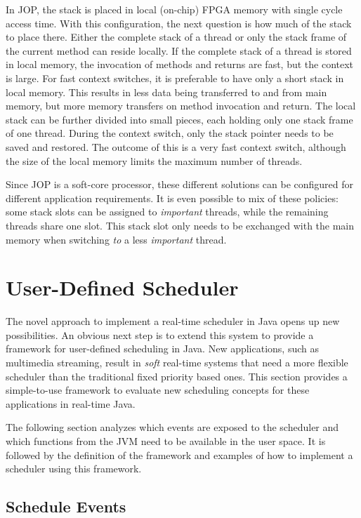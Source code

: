 In JOP, the stack is placed in local (on-chip) FPGA memory with
single cycle access time. With this configuration, the next question
is how much of the stack to place there. Either the complete stack of
a thread or only the stack frame of the current method can reside
locally. If the complete stack of a thread is stored in local memory,
the invocation of methods and returns are fast, but the context is
large. For fast context switches, it is preferable to have only a
short stack in local memory. This results in less data being
transferred to and from main memory, but more memory transfers on
method invocation and return. The local stack can be further divided
into small pieces, each holding only one stack frame of one thread.
During the context switch, only the stack pointer needs to be saved
and restored. The outcome of this is a very fast context switch,
although the size of the local memory limits the maximum number of
threads.

Since JOP is a soft-core processor, these different solutions can be
configured for different application requirements. It is even
possible to mix of these policies: some stack slots can be assigned
to \emph{important} threads, while the remaining threads share one
slot. This stack slot only needs to be exchanged with the main memory
when switching \emph{to} a less \emph{important} thread.


\section{User-Defined Scheduler}
\label{sec:usersched}

The novel approach to implement a real-time scheduler in Java opens
up new possibilities. An obvious next step is to extend this system
to provide a framework for user-defined scheduling in Java. New
applications, such as multimedia streaming, result in \emph{soft}
real-time systems that need a more flexible scheduler than the
traditional fixed priority based ones. This section provides a
simple-to-use framework to evaluate new scheduling concepts for
these applications in real-time Java.

The following section analyzes which events are exposed to the
scheduler and which functions from the JVM need to be available in
the user space. It is followed by the definition of the framework
and examples of how to implement a scheduler using this framework.

\subsection{Schedule Events}

